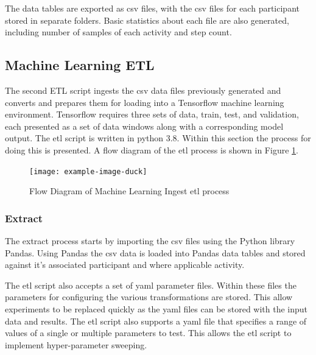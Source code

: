 The data tables are exported as \acrfull{csv} files, with the \acrshort{csv} files for each participant stored in separate folders. Basic statistics about each file are also generated, including number of samples of each activity and step count.

\subsection{Machine Learning ETL}
\label{subsec:ML-ETL}
The second ETL script ingests the \acrshort{csv} data files previously generated and converts and prepares them for loading into a Tensorflow machine learning environment. Tensorflow requires three sets of data, train, test, and validation, each presented as a set of data windows along with a corresponding model output. The \acrshort{etl} script is written in python 3.8. Within this section the process for doing this is presented. A flow diagram of the \acrshort{etl} process is shown in Figure \ref{fig:methods_ml_ETL}.

\begin{figure}[!hbt]
    \centering
    \texttt{[image: example-image-duck]}
    \caption{Flow Diagram of Machine Learning Ingest \acrshort{etl} process}
    \label{fig:methods_ml_ETL}
\end{figure}

\subsubsection{Extract}
The extract process starts by importing the \acrshort{csv} files using the Python library Pandas. Using Pandas the \acrshort{csv} data is loaded into Pandas data tables and stored against it's associated participant and where applicable activity.

The \acrshort{etl} script also accepts a set of \acrshort{yaml} parameter files. Within these files the parameters for configuring the various transformations are stored. This allow experiments to be replaced quickly as the \acrshort{yaml} files can be stored with the input data and results. The \acrshort{etl} script also supports a \acrshort{yaml} file that specifies a range of values of a single or multiple parameters to test. This allows the \acrshort{etl} script to implement hyper-parameter sweeping.


